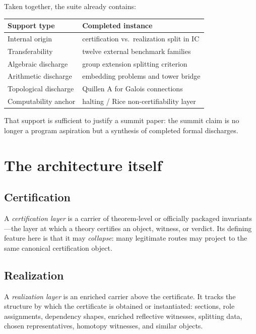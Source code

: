 \documentclass[11pt]{article}
\begin{document}
Taken together, the suite already contains:
\begin{center}
\begin{tabular}{@{}ll@{}}
\toprule
\textbf{Support type} & \textbf{Completed instance} \\
\midrule
Internal origin & certification vs.\ realization split in IC \\
Transferability & twelve external benchmark families \\
Algebraic discharge & group extension splitting criterion \\
Arithmetic discharge & embedding problems and tower bridge \\
Topological discharge & Quillen A for Galois connections \\
Computability anchor & halting / Rice non-certifiability layer \\
\bottomrule
\end{tabular}
\end{center}

That support is sufficient to justify a summit paper: the summit claim is no
longer a program aspiration but a synthesis of completed formal discharges.

\section{The architecture itself}\label{sec:architecture}

\subsection{Certification}

A \emph{certification layer} is a carrier of theorem-level or officially packaged
invariants---the layer at which a theory certifies an object, witness, or verdict.
Its defining feature here is that it may \emph{collapse}: many legitimate routes may
project to the same canonical certification object.

\subsection{Realization}

A \emph{realization layer} is an enriched carrier above the certificate. It tracks
the structure by which the certificate is obtained or instantiated: sections,
role assignments, dependency shapes, enriched reflective witnesses, splitting
data, chosen representatives, homotopy witnesses, and similar objects.
\end{document}
